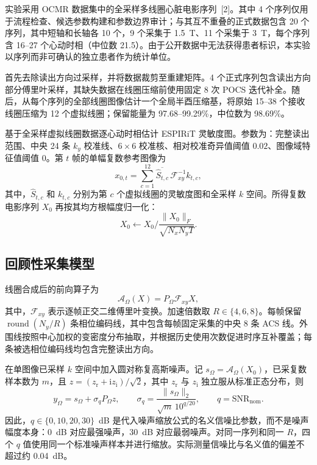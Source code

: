 实验采用 OCMR 数据集中的全采样多线圈心脏电影序列~[2]。其中 4 个序列仅用于流程检查、候选参数构建和参数边界审计；与其互不重叠的正式数据包含 20 个序列，其中短轴和长轴各 10 个，9 个采集于 1.5~T、11 个采集于 3~T，每个序列含 16--27 个心动时相（中位数 21.5）。由于公开数据中无法获得患者标识，本实验以序列而非可确认的独立患者作为统计单位。

首先去除读出方向过采样，并将数据裁剪至重建矩阵。4 个正式序列包含读出方向部分傅里叶采样，其缺失数据在线圈压缩前使用固定 8 次 POCS 迭代补全。随后，从每个序列的全部线圈图像估计一个全局半酉压缩基，将原始 15--38 个接收线圈压缩为 12 个虚拟线圈；保留能量为 97.68--99.29\%，中位数为 98.69\%。

基于全采样虚拟线圈数据逐心动时相估计 ESPIRiT 灵敏度图。参数为：完整读出范围、中央 24 条 $k_y$ 校准线、$6\times6$ 校准核、相对校准奇异值阈值 $0.02$、图像域特征值阈值 0。第 $t$ 帧的单幅复数参考图像为
\begin{equation}
  x_{0,t}=\sum_{c=1}^{12}\overline{\widehat S_{t,c}}\,
  \mathcal F^{-1}_{xy}k_{t,c},
  \label{eq:coil_combination_zh}
\end{equation}
其中，$\widehat S_{t,c}$ 和 $k_{t,c}$ 分别为第 $c$ 个虚拟线圈的灵敏度图和全采样 $k$ 空间。所得复数电影序列 $X_0$ 再按其均方根幅度归一化：
\begin{equation}
  X_0\leftarrow X_0\bigg/
  \frac{\lVert X_0\rVert_F}{\sqrt{N_xN_yT}}.
  \label{eq:rms_normalization_zh}
\end{equation}

\subsection{回顾性采集模型}
\label{sec:acquisition_model_zh}

线圈合成后的前向算子为
\begin{equation}
  \mathcal A_{\Omega}(X)=P_{\Omega}\mathcal F_{xy}X,
  \label{eq:single_image_forward_zh}
\end{equation}
其中，$\mathcal F_{xy}$ 表示逐帧正交二维傅里叶变换。加速倍数取 $R\in\{4,6,8\}$。每帧保留 $\operatorname{round}(N_y/R)$ 条相位编码线，其中包含每帧固定采集的中央 8 条 ACS 线。外围线按照中心加权的变密度分布抽取，并根据历史使用次数促进时序互补覆盖；每条被选相位编码线均包含完整读出方向。

在单图像已采样 $k$ 空间中加入圆对称复高斯噪声。记 $s_{\Omega}=\mathcal A_{\Omega}(X_0)$，已采复数样本数为 $m$，且 $z=(z_{\mathrm r}+\mathrm i z_{\mathrm i})/\sqrt2$，其中 $z_{\mathrm r}$ 与 $z_{\mathrm i}$ 独立服从标准正态分布，则
\begin{equation}
  y_{\Omega}=s_{\Omega}+\sigma_qP_{\Omega}z,
  \qquad
  \sigma_q=\frac{\lVert s_{\Omega}\rVert_2}
  {\sqrt m\,10^{q/20}},
  \qquad q=\mathrm{SNR}_{\mathrm{nom}}.
  \label{eq:noise_scale_zh}
\end{equation}
因此，$q\in\{0,10,20,30\}$~dB 是代入噪声缩放公式的名义信噪比参数，而不是噪声幅度本身：0~dB 对应最强噪声，30~dB 对应最弱噪声。对同一序列和同一 $R$，四个 $q$ 值使用同一个标准噪声样本并进行缩放。实际测量信噪比与名义值的偏差不超过约 0.04~dB。

